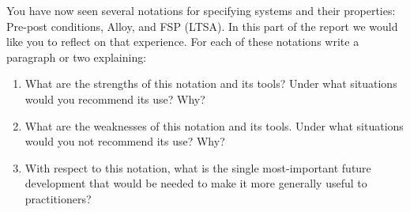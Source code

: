 \documentclass{article}
\begin{document}
 You have now seen several notations for specifying systems and their properties: Pre-post conditions,
 Alloy, and FSP (LTSA).  In this part of the report we would like you to reflect on that experience.
 For each of these notations write a paragraph or two explaining:
\begin{enumerate}
 \item What are the strengths of this notation and its tools?  Under what situations would you
recommend its use? Why?
 \item What are the weaknesses of this notation and its tools. Under what
situations would you not recommend its use? Why?
 \item With respect to this notation, what is
the single most-important future development that would be needed to make it more generally useful
to practitioners?

\end{enumerate}
\end{document}

